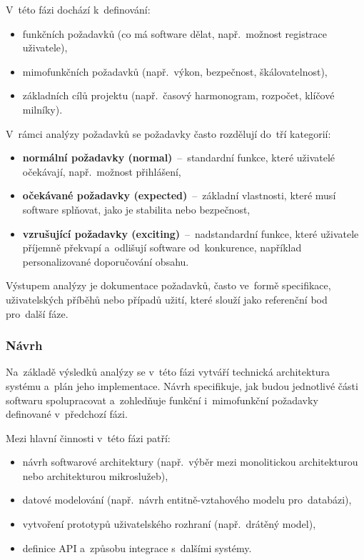 \documentclass[male,czech,api_bc]{kitheses}
\begin{document}
V~této fázi dochází k~definování:
\begin{itemize}
	\item funkčních požadavků (co má software dělat, např.~možnost registrace uživatele),
	\item mimofunkčních požadavků (např.~výkon, bezpečnost, škálovatelnost),
	\item základních cílů projektu (např.~časový harmonogram, rozpočet, klíčové milníky).
\end{itemize}

V~rámci analýzy požadavků se požadavky často rozdělují do~tří kategorií:
\begin{itemize}
	\item \textbf{normální požadavky (normal)}~--~standardní funkce, které uživatelé očekávají, např.~možnost přihlášení,
	\item \textbf{očekávané požadavky (expected)}~--~základní vlastnosti, které musí software splňovat, jako je stabilita nebo bezpečnost,
	\item \textbf{vzrušující požadavky (exciting)}~--~nadstandardní funkce, které uživatele příjemně překvapí a~odlišují software od~konkurence, například personalizované doporučování obsahu.\cite{analyzaPozadavku}
\end{itemize}

Výstupem analýzy je dokumentace požadavků, často ve~formě specifikace, uživatelských příběhů nebo případů užití, které slouží jako referenční bod pro~další fáze.

\subsubsection{Návrh}

Na~základě výsledků analýzy se v~této fázi vytváří technická architektura systému a~plán jeho implementace. Návrh specifikuje, jak budou jednotlivé části softwaru spolupracovat a~zohledňuje funkční i~mimofunkční požadavky definované v~předchozí fázi.

Mezi hlavní činnosti v~této fázi patří:
\begin{itemize}
	\item návrh softwarové architektury (např.~výběr mezi monolitickou architekturou nebo architekturou mikroslužeb),
	\item datové modelování (např.~návrh entitně-vztahového modelu pro~databázi),
	\item vytvoření prototypů uživatelského rozhraní (např.~drátěný model),
	\item definice API a~způsobu integrace s~dalšími systémy.
\end{itemize}
\end{document}
